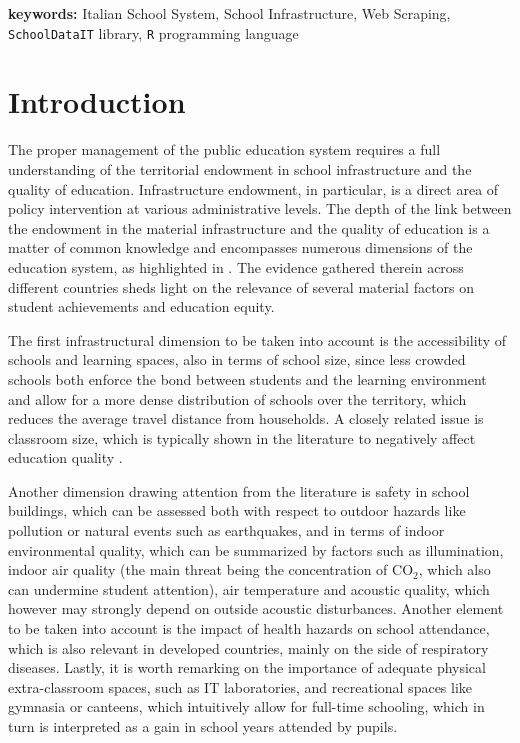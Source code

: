 \documentclass{article}%
\begin{document}
\noindent \textbf{keywords:} Italian School System, School Infrastructure, Web Scraping, \texttt{SchoolDataIT} library, \texttt{R} programming language



\section{Introduction}
The proper management of the public education system requires a full understanding of the territorial endowment in school infrastructure and the quality of education. Infrastructure endowment, in particular, is a direct area of policy intervention at various administrative levels. The depth of the link between the endowment in the material infrastructure and the quality of education is a matter of common knowledge and encompasses numerous dimensions of the education system, as highlighted in \cite{WB}. The evidence gathered therein across different countries sheds light on the relevance of several material factors on student achievements and education equity.

The first infrastructural dimension to be taken into account is the accessibility of schools and learning spaces, also in terms of school size, since less crowded schools both enforce the bond between students and the learning environment and allow for a more dense distribution of schools over the territory, which reduces the average travel distance from households. A closely related issue is classroom size, which is typically shown in the literature to negatively affect education quality \citep{WB}.

Another dimension drawing attention from the literature is safety in school buildings, which can be assessed both with respect to outdoor hazards like pollution or natural events such as earthquakes, and in terms of indoor environmental quality, which can be summarized by factors such as illumination, indoor air quality (the main threat being the concentration of $\mathrm{CO_{2}}$, which also can undermine student attention), air temperature and acoustic quality, which however may strongly depend on outside acoustic disturbances. Another element to be taken into account is the impact of health hazards on school attendance, which is also relevant in developed countries, mainly on the side of respiratory diseases. Lastly, it is worth remarking on the importance of adequate physical extra-classroom spaces, such as IT laboratories, and recreational spaces like gymnasia or canteens, which intuitively allow for full-time schooling, which in turn is interpreted as a gain in school years attended by pupils.
\end{document}
